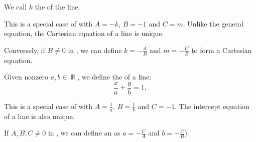 \begin{definition}
\begin{DefEnum}
    We call \( k \) the  of the line.

    This is a special case of  with \( A = -k \), \( B = -1 \) and \( C = m \). Unlike the general equation, the Cartesian equation of a line is unique.

    Conversely, if \( B \neq 0 \) in , we can define \( k = -\tfrac A B \) and \( m = -\tfrac C B \) to form a Cartesian equation.

     Given nonzero \( a, b \in \BbbR \), we define the  of a line:
    \begin{equation}\label{def:plane_line_equations/intercept_equation}
      \frac x a + \frac y b = 1,
    \end{equation}

    This is a special case of  with \( A = \frac 1 a \), \( B = \frac 1 b \) and \( C = -1 \). The intercept equation of a line is also unique.

    If \( A, B, C \neq 0 \) in , we can define an  as \( a = -\tfrac C A \) and \( b = -\tfrac C B \)).
  \end{DefEnum}
\end{definition}

